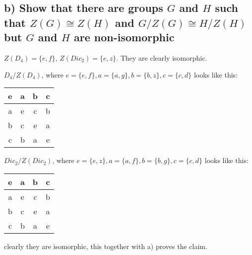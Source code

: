 \newpage
\subsection*{b) Show that there are groups $G$ and $H$ such that $Z(G) \cong Z(H)$ and $G/Z(G) \cong H/Z(H)$ but $G$ and $H$ are non-isomorphic}

$Z(D_4)=\{e,f\}$, $Z(Dic_2)=\{e,z\}$. They are clearly isomorphic.

$D_4/Z(D_4)$, where $e=\{e,f\}, a = \{a,g\}, b=\{b,z\}, c= \{c,d\}$ looks like this:

\begin{tabular}{|c|c|c|c|}\hline
e & a & b & c \\\hline
a & e & c & b \\\hline
b & c & e & a \\\hline
c & b & a & e \\\hline
\end{tabular}

$Dic_2/Z(Dic_2)$, where $e=\{e,z\}, a = \{a,f\}, b=\{b,g\}, c= \{c,d\}$ looks like this:

\begin{tabular}{|c|c|c|c|}\hline
e & a & b & c \\\hline
a & e & c & b \\\hline
b & c & e & a \\\hline
c & b & a & e \\\hline
\end{tabular}

clearly they are isomorphic, this together with a) proves the claim.